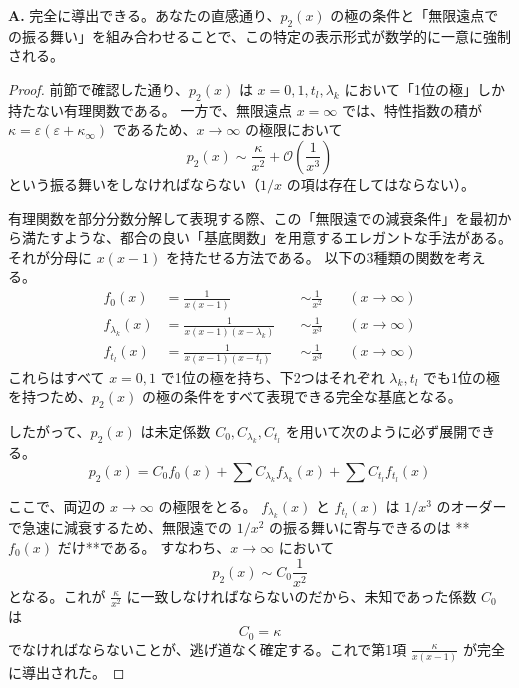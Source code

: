 \begin{Q}
\textbf{A.} 完全に導出できる。あなたの直感通り、$p_2(x)$ の極の条件と「無限遠点での振る舞い」を組み合わせることで、この特定の表示形式が数学的に一意に強制される。

\begin{proof}
前節で確認した通り、$p_2(x)$ は $x=0, 1, t_l, \lambda_k$ において「1位の極」しか持たない有理関数である。
一方で、無限遠点 $x=\infty$ では、特性指数の積が $\kappa = \varepsilon(\varepsilon+\kappa_\infty)$ であるため、$x \to \infty$ の極限において
\begin{equation}
p_2(x) \sim \frac{\kappa}{x^2} + \mathcal{O}\left(\frac{1}{x^3}\right)
\end{equation}
という振る舞いをしなければならない（$1/x$ の項は存在してはならない）。

有理関数を部分分数分解して表現する際、この「無限遠での減衰条件」を最初から満たすような、都合の良い「基底関数」を用意するエレガントな手法がある。それが分母に $x(x-1)$ を持たせる方法である。
以下の3種類の関数を考える。
\begin{align*}
f_0(x) &= \frac{1}{x(x-1)} \quad &\sim \frac{1}{x^2} \quad &(x \to \infty) \\
f_{\lambda_k}(x) &= \frac{1}{x(x-1)(x-\lambda_k)} \quad &\sim \frac{1}{x^3} \quad &(x \to \infty) \\
f_{t_l}(x) &= \frac{1}{x(x-1)(x-t_l)} \quad &\sim \frac{1}{x^3} \quad &(x \to \infty)
\end{align*}
これらはすべて $x=0, 1$ で1位の極を持ち、下2つはそれぞれ $\lambda_k, t_l$ でも1位の極を持つため、$p_2(x)$ の極の条件をすべて表現できる完全な基底となる。

したがって、$p_2(x)$ は未定係数 $C_0, C_{\lambda_k}, C_{t_l}$ を用いて次のように必ず展開できる。
\begin{equation*}
p_2(x) = C_0 f_0(x) + \sum C_{\lambda_k} f_{\lambda_k}(x) + \sum C_{t_l} f_{t_l}(x)
\end{equation*}

ここで、両辺の $x \to \infty$ の極限をとる。
$f_{\lambda_k}(x)$ と $f_{t_l}(x)$ は $1/x^3$ のオーダーで急速に減衰するため、無限遠での $1/x^2$ の振る舞いに寄与できるのは **$f_0(x)$ だけ**である。
すなわち、$x \to \infty$ において
\begin{equation*}
p_2(x) \sim C_0 \frac{1}{x^2}
\end{equation*}
となる。これが $\frac{\kappa}{x^2}$ に一致しなければならないのだから、未知であった係数 $C_0$ は
\begin{equation*}
C_0 = \kappa
\end{equation*}
でなければならないことが、逃げ道なく確定する。これで第1項 $\frac{\kappa}{x(x-1)}$ が完全に導出された。


\end{proof}
\end{Q}
